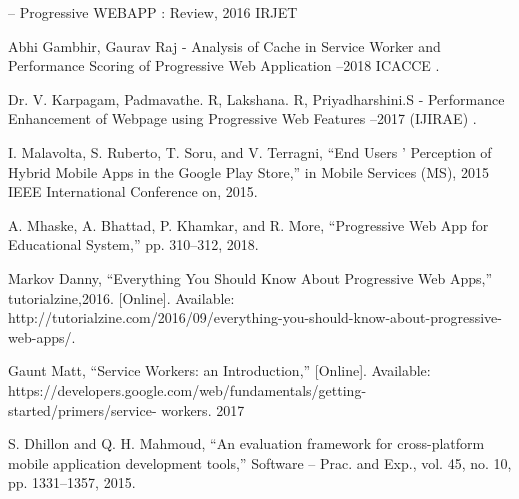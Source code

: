 \documentclass[14pt,a4paper,final]{extreport}
\begin{document}
\newpage
{}
\begin{thebibliography}{9}
{\fontsize{13pt}{8.4pt}\selectfont {Rahul Surendra Mishra} – Progressive WEBAPP : Review, 2016
      IRJET
\par}\par

{\fontsize{13pt}{8.4pt}\selectfont Abhi Gambhir, Gaurav Raj - Analysis of Cache in Service  
     Worker and Performance Scoring of Progressive Web 
     Application –2018 ICACCE
.\par}\par

{\fontsize{13pt}{8.4pt}\selectfont Dr. V. Karpagam, Padmavathe. R, Lakshana. R, Priyadharshini.S
      - Performance Enhancement of Webpage using Progressive Web
       Features –2017 (IJIRAE)
.\par}\par

{\fontsize{13pt}{8.4pt}\selectfont I. Malavolta, S. Ruberto, T. Soru, and V. Terragni, “End Users ’ Perception of Hybrid Mobile Apps in the Google Play Store,” in Mobile Services (MS), 2015 IEEE International Conference on, 2015.\par}\par

{\fontsize{13pt}{8.4pt}\selectfont A. Mhaske, A. Bhattad, P. Khamkar, and R. More, “Progressive
Web App for Educational System,” pp. 310–312, 2018.\par}\par

{\fontsize{13pt}{8.4pt}\selectfont Markov Danny, “Everything You Should Know About Progressive Web Apps,” tutorialzine,2016. [Online]. Available: http://tutorialzine.com/2016/09/everything-you-should-know-about-progressive- web-apps/.\par}\par

{\fontsize{13pt}{8.4pt}\selectfont Gaunt Matt, “Service Workers: an Introduction,” [Online]. Available: https://developers.google.com/web/fundamentals/getting-started/primers/service- workers. 2017\par}\par

{\fontsize{13pt}{8.4pt}\selectfont S. Dhillon and Q. H. Mahmoud, “An evaluation framework
for cross-platform mobile application development tools,” Software – Prac. and Exp., vol. 45, no. 10, pp. 1331–1357, 2015.\par}\par


\end{thebibliography}
\end{document}
